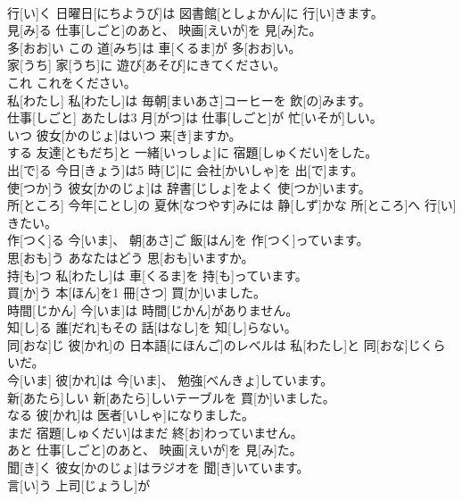 \documentclass[8pt]{extreport}
\begin{document}
\begin{CJK}{UTF8}{min}
\\	行[い]く	日曜日[にちようび]は 図書館[としょかん]に 行[い]きます。		
\\	見[み]る	仕事[しごと]のあと、 映画[えいが]を 見[み]た。		
\\	多[おお]い	この 道[みち]は 車[くるま]が 多[おお]い。		
\\	家[うち]	家[うち]に 遊び[あそび]にきてください。		
\\	これ	これをください。		
\\	私[わたし]	私[わたし]は 毎朝[まいあさ]コーヒーを 飲[の]みます。		
\\	仕事[しごと]	あたしは3 月[がつ]は 仕事[しごと]が 忙[いそが]しい。		
\\	いつ	彼女[かのじょ]はいつ 来[き]ますか。		
\\	する	友達[ともだち]と 一緒[いっしょ]に 宿題[しゅくだい]をした。		
\\	出[で]る	今日[きょう]は5 時[じ]に 会社[かいしゃ]を 出[で]ます。		
\\	使[つか]う	彼女[かのじょ]は 辞書[じしょ]をよく 使[つか]います。		
\\	所[ところ]	今年[ことし]の 夏休[なつやす]みには 静[しず]かな 所[ところ]へ 行[い]きたい。		
\\	作[つく]る	今[いま]、 朝[あさ]ご 飯[はん]を 作[つく]っています。		
\\	思[おも]う	あなたはどう 思[おも]いますか。		
\\	持[も]つ	私[わたし]は 車[くるま]を 持[も]っています。		
\\	買[か]う	本[ほん]を1 冊[さつ] 買[か]いました。		
\\	時間[じかん]	今[いま]は 時間[じかん]がありません。		
\\	知[し]る	誰[だれ]もその 話[はなし]を 知[し]らない。		
\\	同[おな]じ	彼[かれ]の 日本語[にほんご]のレベルは 私[わたし]と 同[おな]じくらいだ。		
\\	今[いま]	彼[かれ]は 今[いま]、 勉強[べんきょ]しています。		
\\	新[あたら]しい	新[あたら]しいテーブルを 買[か]いました。		
\\	なる	彼[かれ]は 医者[いしゃ]になりました。		
\\	まだ	宿題[しゅくだい]はまだ 終[お]わっていません。		
\\	あと	仕事[しごと]のあと、 映画[えいが]を 見[み]た。		
\\	聞[き]く	彼女[かのじょ]はラジオを 聞[き]いています。		
\\	言[い]う	上司[じょうし]が

\end{CJK}
\end{document}
